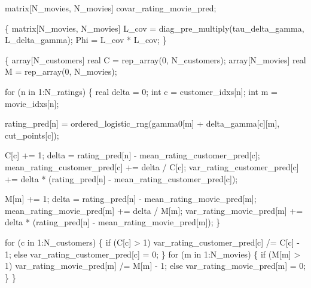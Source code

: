 \documentclass[
  letterpaper,
  DIV=11,
  numbers=noendperiod]{scrartcl}
\newenvironment{Shaded}{\begin{snugshade}}{\end{snugshade}}
\newcommand{\ControlFlowTok}[1]{\textcolor[rgb]{0.00,0.23,0.31}{#1}}
\newcommand{\DataTypeTok}[1]{\textcolor[rgb]{0.68,0.00,0.00}{#1}}
\newcommand{\DecValTok}[1]{\textcolor[rgb]{0.68,0.00,0.00}{#1}}
\newcommand{\NormalTok}[1]{\textcolor[rgb]{0.00,0.23,0.31}{#1}}
\begin{document}
\begin{codelisting}
\begin{Shaded}
\begin{Highlighting}[]
  \DataTypeTok{matrix}\NormalTok{[N\_movies, N\_movies] covar\_rating\_movie\_pred;}

\NormalTok{  \{}
    \DataTypeTok{matrix}\NormalTok{[N\_movies, N\_movies] L\_cov}
\NormalTok{      = diag\_pre\_multiply(tau\_delta\_gamma, L\_delta\_gamma);}
\NormalTok{    Phi = L\_cov * L\_cov\textquotesingle{};}
\NormalTok{  \}}

\NormalTok{  \{}
    \DataTypeTok{array}\NormalTok{[N\_customers] }\DataTypeTok{real}\NormalTok{ C = rep\_array(}\DecValTok{0}\NormalTok{, N\_customers);}
    \DataTypeTok{array}\NormalTok{[N\_movies] }\DataTypeTok{real}\NormalTok{ M = rep\_array(}\DecValTok{0}\NormalTok{, N\_movies);}

    \ControlFlowTok{for}\NormalTok{ (n }\ControlFlowTok{in} \DecValTok{1}\NormalTok{:N\_ratings) \{}
      \DataTypeTok{real}\NormalTok{ delta = }\DecValTok{0}\NormalTok{;}
      \DataTypeTok{int}\NormalTok{ c = customer\_idxs[n];}
      \DataTypeTok{int}\NormalTok{ m = movie\_idxs[n];}

\NormalTok{      rating\_pred[n]}
\NormalTok{        = ordered\_logistic\_rng(gamma0[m] + delta\_gamma[c][m],}
\NormalTok{                               cut\_points[c]);}

\NormalTok{      C[c] += }\DecValTok{1}\NormalTok{;}
\NormalTok{      delta = rating\_pred[n] {-} mean\_rating\_customer\_pred[c];}
\NormalTok{      mean\_rating\_customer\_pred[c] += delta / C[c];}
\NormalTok{      var\_rating\_customer\_pred[c]}
\NormalTok{        += delta * (rating\_pred[n] {-} mean\_rating\_customer\_pred[c]);}

\NormalTok{      M[m] += }\DecValTok{1}\NormalTok{;}
\NormalTok{      delta = rating\_pred[n] {-} mean\_rating\_movie\_pred[m];}
\NormalTok{      mean\_rating\_movie\_pred[m] += delta / M[m];}
\NormalTok{      var\_rating\_movie\_pred[m]}
\NormalTok{        += delta * (rating\_pred[n] {-} mean\_rating\_movie\_pred[m]);}
\NormalTok{    \}}

    \ControlFlowTok{for}\NormalTok{ (c }\ControlFlowTok{in} \DecValTok{1}\NormalTok{:N\_customers) \{}
      \ControlFlowTok{if}\NormalTok{ (C[c] \textgreater{} }\DecValTok{1}\NormalTok{)}
\NormalTok{        var\_rating\_customer\_pred[c] /= C[c] {-} }\DecValTok{1}\NormalTok{;}
      \ControlFlowTok{else}
\NormalTok{        var\_rating\_customer\_pred[c] = }\DecValTok{0}\NormalTok{;}
\NormalTok{    \}}
    \ControlFlowTok{for}\NormalTok{ (m }\ControlFlowTok{in} \DecValTok{1}\NormalTok{:N\_movies) \{}
      \ControlFlowTok{if}\NormalTok{ (M[m] \textgreater{} }\DecValTok{1}\NormalTok{)}
\NormalTok{        var\_rating\_movie\_pred[m] /= M[m] {-} }\DecValTok{1}\NormalTok{;}
      \ControlFlowTok{else}
\NormalTok{        var\_rating\_movie\_pred[m] = }\DecValTok{0}\NormalTok{;}
\NormalTok{    \}}
\NormalTok{  \}}


\end{Highlighting}
\end{Shaded}
\end{codelisting}
\end{document}
